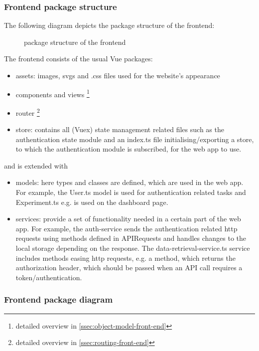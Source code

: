 \subsubsection*{Frontend package structure}
The following diagram depicts the package structure of the frontend:
\begin{figure}[!ht]
    \centering
    
    \caption{package structure of the frontend}
    \label{fig:package_structure_front_end}
\end{figure}

\pagebreak

The frontend consists of the usual Vue packages:
    \begin{itemize}
        \item assets: images, svgs and .css files used for the website's appearance
        \item components and views \footnote{detailed overview in \ref{ssec:object-model-front-end}}
        \item router \footnote{detailed overview in \ref{ssec:routing-front-end}}
        \item store: contains all (Vuex) state management related files such as the authentication state module and an index.ts file initialising/exporting a store, to which the authentication module is subscribed, for the web app to use.  
    \end{itemize}
and is extended with 
     \begin{itemize}
        \item models: here types and classes are defined, which are used in the web app. For example, the User.ts model is used for authentication related tasks and Experiment.ts e.g. is used on the dashboard page.  
        \item services: provide a set of functionality needed in a certain part of the web app. For example, the auth-service sends the authentication related http requests using methods defined in APIRequests and handles changes to the local storage depending on the response. The data-retrieval-service.ts service includes methods easing http requests, e.g. a method, which returns the authorization header, which should be passed when an API call requires a token/authentication. 
    \end{itemize}

\newpage

\subsubsection*{Frontend package diagram}

